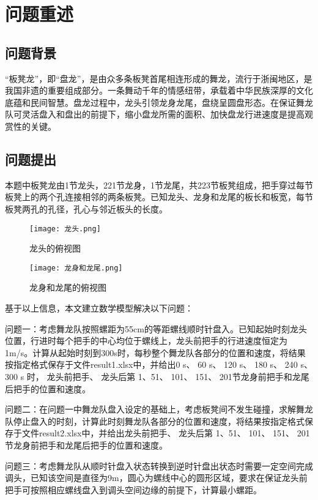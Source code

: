 \documentclass[withoutpreface,bwprint]{cumcmthesis} %
\begin{document}
	\section{问题重述}
	\subsection{问题背景}
	“板凳龙”，即“盘龙”，是由众多条板凳首尾相连形成的舞龙，流行于浙闽地区，是我国非遗的重要组成部分。一条舞动千年的情感纽带，承载着中华民族深厚的文化底蕴和民间智慧。盘龙过程中，龙头引领龙身龙尾，盘绕呈圆盘形态。在保证舞龙队可灵活盘入和盘出的前提下，缩小盘龙所需的面积、加快盘龙行进速度是提高观赏性的关键。
	\subsection{问题提出}
	本题中板凳龙由1节龙头，221节龙身，1节龙尾，共223节板凳组成，把手穿过每节板凳上的两个孔连接相邻的两条板凳。已知龙头、龙身和龙尾的板长和板宽，每节板凳两孔的孔径，孔心与邻近板头的长度。
	\begin{figure}[H]
		\centering
		\texttt{[image: 龙头.png]}
		\caption{龙头的俯视图}
	\end{figure}
	\vspace{-0.4cm} 
	\begin{figure}[H]
		\centering
		\texttt{[image: 龙身和龙尾.png]}
		\caption{龙身和龙尾的俯视图}
	\end{figure}
	基于以上信息，本文建立数学模型解决以下问题：
	
	问题一：考虑舞龙队按照螺距为55cm的等距螺线顺时针盘入。已知起始时刻龙头位置，行进时每个把手的中心均位于螺线上，龙头前把手的行进速度恒定为1m/s。计算从起始时刻到300s时，每秒整个舞龙队各部分的位置和速度，将结果按指定格式保存于文件result1.xlsx中，并给出0 s、 60 s、 120 s、 180 s、 240 s、 300 s 时， 龙头前把手、 龙头后第 1、51、 101、 151、 201节龙身前把手和龙尾后把手的位置和速度。
	
	问题二：在问题一中舞龙队盘入设定的基础上，考虑板凳间不发生碰撞，求解舞龙队停止盘入的时刻，计算此时刻舞龙队各部分的位置和速度，将结果按指定格式保存于文件result2.xlsx中，并给出龙头前把手、 龙头后第 1、51、 101、 151、 201节龙身前把手和龙尾后把手的位置和速度。
	
	问题三：考虑舞龙队从顺时针盘入状态转换到逆时针盘出状态时需要一定空间完成调头，已知该空间是直径为9m，圆心为螺线中心的圆形区域，要求在保证龙头前把手可按照相应螺线盘入到调头空间边缘的前提下，计算最小螺距。
	
\end{document}
